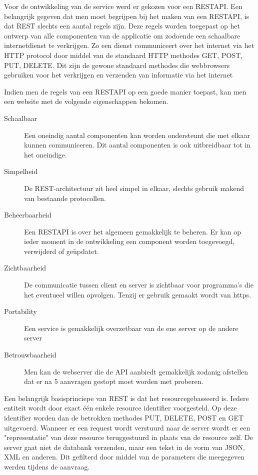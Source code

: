 \documentclass[a4paper,11pt]{article}
\begin{document}
Voor de ontwikkeling van de service werd er gekozen voor een RESTAPI. Een belangrijk gegeven dat men moet begrijpen bij het maken van een RESTAPI, is dat REST slechts een aantal regels zijn. Deze regels worden toegepast op het ontwerp van alle componenten van de applicatie om zodoende een schaalbare internetdienst te verkrijgen. Zo een dienst communiceert over het internet via het HTTP protocol door middel van de standaard HTTP methodes GET, POST, PUT, DELETE. Dit zijn de gewone standaard methodes die webbrowsers gebruiken voor het verkrijgen en verzenden van informatie via het internet

Indien men de regels van een RESTAPI op een goede manier toepast, kan men een website met de volgende eigenschappen bekomen.

\begin{description}
\item[Schaalbaar] Een oneindig aantal componenten kan worden ondersteunt die met elkaar kunnen communiceren. Dit aantal componenten is ook uitbreidbaar tot in het oneindige.
\item[Simpelheid] De REST-architectuur zit heel simpel in elkaar, slechts gebruik makend van bestaande protocollen.
\item[Beheerbaarheid] Een RESTAPI is over het algemeen gemakkelijk te beheren. Er kan op ieder moment in de ontwikkeling een component worden toegevoegd, verwijderd of geüpdatet.
\item[Zichtbaarheid] De communicatie tussen client en server is zichtbaar voor programma's die het eventueel willen opvolgen. Tenzij er gebruik gemaakt wordt van https.
\item[Portability] Een service is gemakkelijk overzetbaar van de ene server op de andere server
\item[Betrouwbaarheid] Men kan de webserver die de API aanbiedt gemakkelijk zodanig afstellen dat er na 5 aanvragen gestopt moet worden met proberen. 
\end{description}

Een belangrijk basisprinciepe van REST is dat het resourcegebasseerd is. Iedere entiteit wordt door exact één enkele resource identifier voorgesteld. Op deze identifier worden dan de betrokken methodes PUT, DELETE, POST en GET uitgevoerd. Wanneer er een request wordt verstuurd naar de server wordt er een "representatie" van deze resource teruggestuurd in plaats van de resource zelf. De server gaat niet de databank verzenden, maar een tekst in de vorm van JSON, XML en anderen. Dit gefilterd door middel van de parameters die meegegeven werden tijdens de aanvraag.
\end{document}
